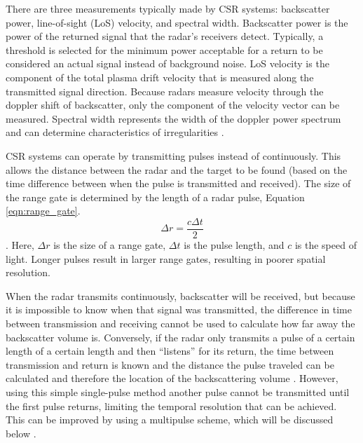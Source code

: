 There are three measurements typically made by CSR systems: backscatter power, line-of-sight (LoS) velocity, and spectral width.  Backscatter power is the power of the returned signal that the radar's receivers detect.  Typically, a threshold is selected for the minimum power acceptable for a return to be considered an actual signal instead of background noise.  LoS velocity is the component of the total plasma drift velocity that is measured along the transmitted signal direction.  Because radars measure velocity through the doppler shift of backscatter, only the component of the velocity vector can be measured.  Spectral width represents the width of the doppler power spectrum and can determine characteristics of irregularities \citep{Greenwald1985}.

CSR systems can operate by transmitting pulses instead of continuously.  This allows the distance between the radar and the target to be found (based on the time difference between when the pulse is transmitted and received).  The size of the range gate is determined by the length of a radar pulse, Equation \ref{eqn:range_gate}.
\begin{equation}
	\label{eqn:range_gate}
	\Delta r = \frac{c\Delta t}{2}
\end{equation}.
Here, \(\Delta r\) is the size of a range gate, \(\Delta t\) is the pulse length, and \(c\) is the speed of light.  Longer pulses result in larger range gates, resulting in poorer spatial resolution.

When the radar transmits continuously, backscatter will be received, but because it is impossible to know when that signal was transmitted, the difference in time between transmission and receiving cannot be used to calculate how far away the backscatter volume is.  Conversely, if the radar only transmits a pulse of a certain length of a certain length and then ``listens'' for its return, the time between transmission and return is known and the distance the pulse traveled can be calculated and therefore the location of the backscattering volume \citep{Farley1972,Greenwald1983}.  However, using this simple single-pulse method another pulse cannot be transmitted until the first pulse returns, limiting the temporal resolution that can be achieved.  This can be improved by using a multipulse scheme, which will be discussed below \citep{Farley1972,Greenwald1983,Greenwald1985}.


